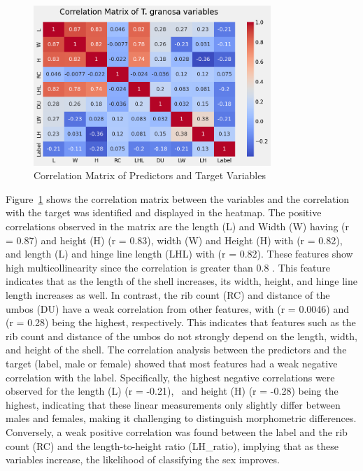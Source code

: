 \begin{figure}[!htbp]
	\centering
	\includegraphics[width=0.8\textwidth]{figures/corr_matrix.png}
	\caption{Correlation Matrix of Predictors and Target Variables}
	\label{fig:corr-matrix}
\end{figure}
\newpage
Figure~\ref{fig:corr-matrix} shows the correlation matrix between the variables and the correlation with the target was identified and displayed in the heatmap. The positive correlations observed in the matrix are the length (L) and Width (W) having (r = 0.87) and height (H) (r = 0.83), width (W) and Height (H) with (r = 0.82), and length (L) and hinge line length (LHL) with (r = 0.82). These features show high multicollinearity since the correlation is greater than 0.8 \cite{kim2019}. This feature indicates that as the length of the shell increases, its width, height, and hinge line length increases as well. In contrast, the rib count (RC) and distance of the umbos (DU) have a weak correlation from other features, with (r = 0.0046) and (r = 0.28) being the highest, respectively. This indicates that features such as the rib count and distance of the umbos do not strongly depend on the length, width, and height of the shell. 
The correlation analysis between the predictors and the target (label, male or female) showed that most features had a weak negative correlation with the label. Specifically, the highest negative correlations were observed for the length (L) (r = -0.21),  and height (H) (r = -0.28) being the highest, indicating that these linear measurements only slightly differ between males and females, making it challenging to distinguish morphometric differences. Conversely, a weak positive correlation was found between the label and the rib count (RC) and the length-to-height ratio (LH\_ratio), implying that as these variables increase, the likelihood of classifying the sex improves.

